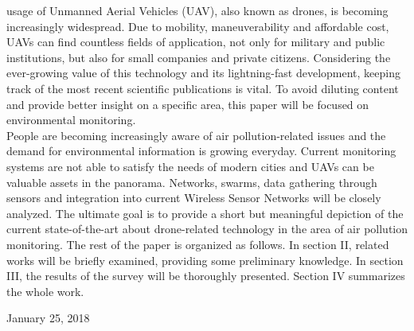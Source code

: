 \documentclass[journal]{IEEEtran}
\begin{document}
 usage of Unmanned Aerial Vehicles (UAV), also known as drones, is becoming increasingly widespread. Due to mobility, maneuverability and affordable cost, UAVs can find countless fields of application, not only for military and public institutions, but also for small companies and private citizens. Considering the ever-growing value of this technology and its lightning-fast development, keeping track of the most recent scientific publications is vital. To avoid diluting content and provide better insight on a specific area, this paper will be focused on environmental monitoring.
\\
People are becoming increasingly aware of air pollution-related issues and the demand for environmental information is growing everyday. Current monitoring systems are not able to satisfy the needs of modern cities and UAVs can be valuable assets in the panorama. Networks, swarms, data gathering through sensors and integration into current Wireless Sensor Networks will be closely analyzed. The ultimate goal is to provide a short but meaningful depiction of the current state-of-the-art about drone-related technology in the area of air pollution monitoring. The rest of the paper is organized as follows. In section II, related works will be briefly examined, providing some preliminary knowledge. In section III, the results of the survey will be thoroughly presented. Section IV summarizes the whole work.
 
\hfill January 25, 2018
\end{document}

